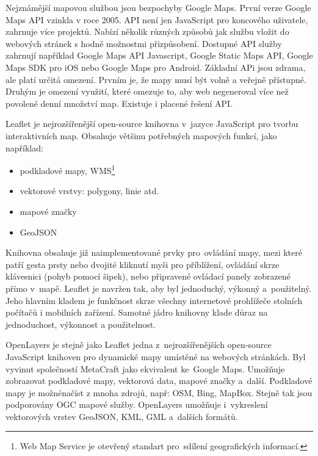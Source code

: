 \documentclass[12pt]{article}%
\begin{document}
{{%
Nejznámější mapovou službou jsou bezpochyby Google Maps. První verze Google Maps API vzinkla 
v roce 2005. API není jen JavaScript pro koncového uživatele, zahrnuje více projektů. Nabízí 
několik různých způsobů jak službu vložit do webových stránek s hodně možnostmi přizpůsobení. 
Dostupné API služby zahrnují například Google Maps API Javascript, Google Static Maps API, Google 
Maps SDK pro iOS nebo Google Maps pro Android. Základní APi jsou zdrama, ale platí určitá omezení. 
Prvním je, že mapy musí být volně a veřejně přístupné. Druhým je omezení využití, které omezuje to, 
aby web negeneroval více než povolené denní množství map. Existuje i placené řešení API.

Leaflet je nejrozšířenější open-source knihovna v~jazyce JavaScript pro tvorbu interaktivních map. 
Obsahuje většinu potřebných mapových funkcí, jako například:
\begin{itemize}
\item podkladové mapy, WMS\footnote{Web Map Service je otevřený standart pro~sdílení geografických 
informací.}
\item vektorové vrstvy: polygony, linie atd.
\item mapové značky
\item GeoJSON
\end{itemize}
Knihovna obsahuje již naimplementované prvky pro~ovládání mapy, mezi které patří gesta prsty nebo 
dvojité kliknutí myši pro příblížení, ovládání skrze klávesnici (pohyb pomocí šipek), nebo 
připravené ovládací panely zobrazené přímo v~mapě. Leaflet je navržen tak, aby byl jednoduchý, 
výkonný a~použitelný. Jeho hlavním kladem je funkčnost skrze všechny internetové prohlížeče 
stolních počítačů i mobilních zařízení. Samotné jádro knihovny klade důraz na jednoduchost, 
výkonnost a použitelnost.

OpenLayers je stejně jako Leaflet jedna z~nejrozšířenějších open-source JavaScript knihoven pro 
dynamické mapy umístěné na webových stránkách. Byl vyvinut společností MetaCraft jako ekvivalent 
ke~Google Maps. Umožňuje zobrazovat podkladové mapy, vektorová data, mapové značky a~další. 
Podkladové mapy je možnénačíst z mnoha zdrojů, např: OSM, Bing, MapBox. Stejně tak jsou 
podporovány OGC mapové služby. OpenLayers umožňuje i~vykreslení vektorových vrstev GeoJSON, KML, 
GML a~dalších formátů.

}}
\end{document}
